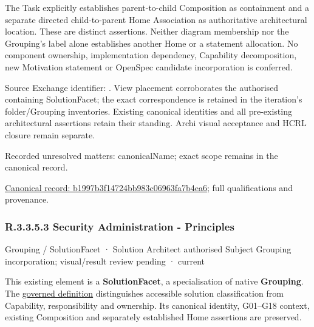 The Task explicitly establishes parent-to-child Composition as containment and
a separate directed child-to-parent Home Association as authoritative architectural
location. These are distinct assertions. Neither diagram membership nor the
Grouping's label alone establishes another Home or a statement allocation.
No component ownership, implementation dependency, Capability decomposition,
new Motivation statement or OpenSpec candidate incorporation is conferred.



Source Exchange identifier: \texttt{}. View placement corroborates
the authorised containing SolutionFacet; the exact correspondence is retained in the
iteration's folder/Grouping inventories. Existing canonical identities and all
pre-existing architectural assertions retain their standing. Archi visual
acceptance and HCRL closure remain separate.


{\small Recorded unresolved matters: canonicalName; exact scope remains in the canonical record.}\par
{\footnotesize \href{../../../../../../../continuum/grouping/b1997b3f14724bb983c06963fa7b4ea6.md}{Canonical record: b1997b3f14724bb983c06963fa7b4ea6}; full qualifications and provenance.}\par
\subsubsection*{R.3.3.5.3 Security Administration - Principles}
\label{navigation:R.3.3.5.3}

\label{element:c189826cd7024780abd89fa4f067947a}
{\small Grouping / SolutionFacet · Solution Architect authorised Subject Grouping incorporation; visual/result review pending · current}\par

This existing element is a \textbf{SolutionFacet}, a specialisation of native
\textbf{Grouping}. The \href{\detokenize{../../../../../../../governance/continuum-representation.md#solutionfacet-classification--1119-candidate}}{governed definition}
distinguishes accessible solution classification from Capability, responsibility
and ownership. Its canonical identity, G01–G18 context, existing Composition
and separately established Home assertions are preserved.




